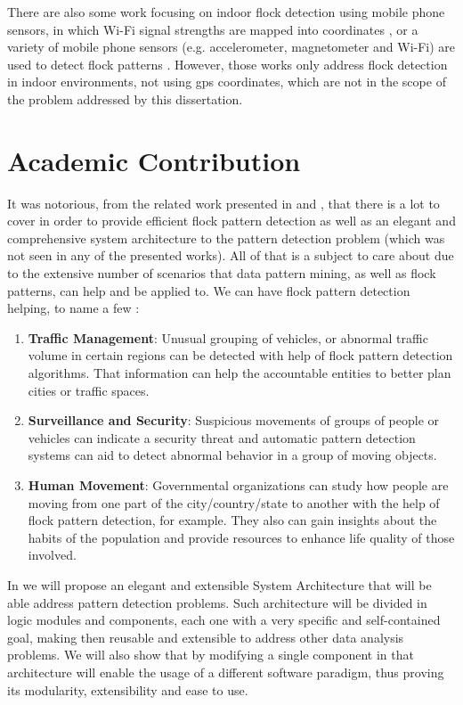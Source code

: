 There are also some work focusing on indoor flock detection using mobile phone sensors, in which Wi-Fi signal strengths
are mapped into coordinates \citep{mobile1}, or a variety of mobile phone sensors (e.g. accelerometer, magnetometer and
Wi-Fi) are used to detect flock patterns \citep{mobile2}. However, those works only address flock detection in indoor
environments, not using \ac{gps} coordinates, which are not in the scope of the problem addressed by this dissertation.

\section{Academic Contribution}
It was notorious, from the related work presented in  and , that there is
a lot to cover in order to provide efficient flock pattern detection as well as an elegant and comprehensive system
architecture to the pattern detection problem (which was not seen in any of the presented works). All of that is a
subject to care about due to the extensive number of scenarios that data pattern mining, as well as flock patterns, can
help and be applied to. We can have flock pattern detection helping, to name a few \citep{applications}:

\begin{enumerate}
    \item \textbf{Traffic Management}: Unusual grouping of vehicles, or abnormal traffic volume in certain regions can
        be detected with help of flock pattern detection algorithms. That information can help the accountable entities
        to better plan cities or traffic spaces.
    \item \textbf{Surveillance and Security}: Suspicious movements of groups of people or vehicles can indicate a
        security threat and automatic pattern detection systems can aid to detect abnormal behavior in a group of moving
        objects.
    \item \textbf{Human Movement}: Governmental organizations can study how people are moving from one part of the
        city/country/state to another with the help of flock pattern detection, for example. They also can gain insights
        about the habits of the population and provide resources to enhance life quality of those involved.
\end{enumerate}

In  we will propose an elegant and extensible System Architecture that will be able address
pattern detection problems. Such architecture will be divided in logic modules and components, each one with a very
specific and self-contained goal, making then reusable and extensible to address other data analysis problems. We will
also show that by modifying a single component in that architecture will enable the usage of a different software
paradigm, thus proving its modularity, extensibility and ease to use.

